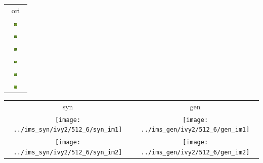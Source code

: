 \documentclass[letter]{article}
\begin{document}
\newpage

\begin{table}[h!]
	\centering
	\begin{tabular}{c}
		ori\tabularnewline
		\includegraphics[width=0.17\textwidth]{../data/ivy2/512/1} \tabularnewline		\includegraphics[width=0.17\textwidth]{../data/ivy2/512/2} \tabularnewline		\includegraphics[width=0.17\textwidth]{../data/ivy2/512/3} \tabularnewline		\includegraphics[width=0.17\textwidth]{../data/ivy2/512/4} \tabularnewline		\includegraphics[width=0.17\textwidth]{../data/ivy2/512/5} \tabularnewline		\includegraphics[width=0.17\textwidth]{../data/ivy2/512/6} \tabularnewline
	\end{tabular}
	\begin{tabular}{cc}
		syn & gen\tabularnewline
		\texttt{[image: ../ims\_syn/ivy2/512\_6/syn\_im1]} & \texttt{[image: ../ims\_gen/ivy2/512\_6/gen\_im1]} \tabularnewline
		\texttt{[image: ../ims\_syn/ivy2/512\_6/syn\_im2]} & \texttt{[image: ../ims\_gen/ivy2/512\_6/gen\_im2]} \tabularnewline

\end{tabular}
\end{table}
\end{document}

